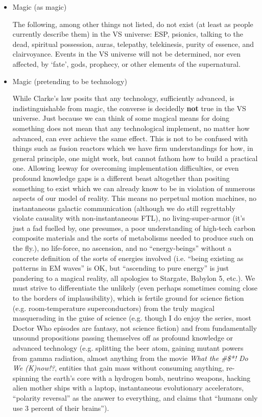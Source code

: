 \begin{itemize}
\item Magic (as magic)

The following, among other things not listed, do not exist (at least
as people currently describe them) in the VS universe: ESP, psionics,
talking to the dead, spiritual possession, auras, telepathy,
telekinesis, purity of essence, and clairvoyance. Events in the VS
universe will not be determined, nor even affected, by `fate', gods,
prophecy, or other elements of the supernatural.

\item Magic (pretending to be technology)

While Clarke's law posits that any technology, sufficiently advanced,
is indistinguishable from magic, the converse is decidedly {\bf not}
true in the VS universe. Just because we can think of some magical
means for doing something does not mean that any technological
implement, no matter how advanced, can ever achieve the same
effect. This is not to be confused with things such as fusion reactors
which we have firm understandings for how, in general principle, one
might work, but cannot fathom how to build a practical one. Allowing
leeway for overcoming implementation difficulties, or even profound
knowledge gaps is a different beast altogether than positing something
to exist which we can already know to be in violation of numerous
aspects of our model of reality. This means no perpetual motion
machines, no instantaneous galactic communication (although we do
still regrettably violate causality with non-instantaneous FTL), no
living-super-armor (it's just a fad fuelled by, one presumes, a poor
understanding of high-tech carbon composite materials and the sorts of
metabolisms needed to produce such on the fly.), no life-force, no
ascension, and no ``energy-beings'' without a concrete definition of
the sorts of energies involved (i.e. ``being existing as patterns in
EM waves'' is OK, but ``ascending to pure energy'' is just pandering
to a magical reality, all apologies to Stargate, Babylon 5, etc.). We
must strive to differentiate the unlikely (even perhaps sometimes
coming close to the borders of implausibility), which is fertile
ground for science fiction (e.g. room-temperature superconductors)
from the truly magical masquerading in the guise of science
(e.g. though I do enjoy the series, most Doctor Who episodes are
fantasy, not science fiction) and from fundamentally unsound
propositions passing themselves off as profound knowledge or advanced
technology (e.g. splitting the beer atom, gaining mutant powers from
gamma radiation, almost anything from the movie {\em What the \#\$*! Do
We (K)now!?}, entities that gain mass without consuming anything,
re-spinning the earth's core with a hydrogen bomb, neutrino weapons,
hacking alien mother ships with a laptop, instantaneous evolutionary
accelerators, ``polarity reversal'' as the answer to everything, and
claims that ``humans only use 3 percent of their brains'').


\end{itemize}

